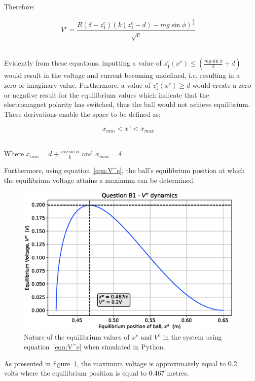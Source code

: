 \documentclass[a4paper,10pt,reqno]{amsart}
\numberwithin{equation}{section}
\begin{document}
\par Therefore:

\begin{equation}
\label{eqn:V^e}
    V^e = \frac{R(\delta-z_1^e)(k(z_1^e-d)-mg\sin{\phi})^\frac{1}{2}}{\sqrt{c}}
\end{equation}
\\
\par Evidently from these equations, inputting a value of $z_1^e(x^e) \leq (\frac{mg\sin{\phi}}{k}+d)$ would result in the voltage and current becoming undefined, i.e. resulting in a zero or imaginary value. Furthermore, a value of $z_1^e(x^e) \geq d$ would create a zero or negative result for the equilibrium values which indicate that the electromagnet polarity has switched, thus the ball would not achieve equilibrium. These derivations enable the space to be defined as:

\begin{equation}
    x_{min} < x^e < x_{max}
\end{equation}
\\
\par Where $x_{min} = d + \frac{mg\sin{\phi}}{k}$ and $x_{max} = \delta$
\\
\par Furthermore, using equation~\ref{eqn:V^e}, the ball's equilibrium position at which the equilibrium voltage attains a maximum can be determined.
\\
\begin{figure}[h]
\label{fig:B1Diagram}
 \centering
 \includegraphics[width=0.6\linewidth]{Figures/B1.eps}
 \caption{Nature of the equilibrium values of $x^e$ and $V^e$ in the system using equation~\ref{eqn:V^e} when simulated in Python.}
\end{figure}

\par As presented in figure~\ref{fig:B1Diagram}, the maximum voltage is approximately equal to 0.2 volts where the equilibrium position is equal to 0.467 metres.

\end{document}

